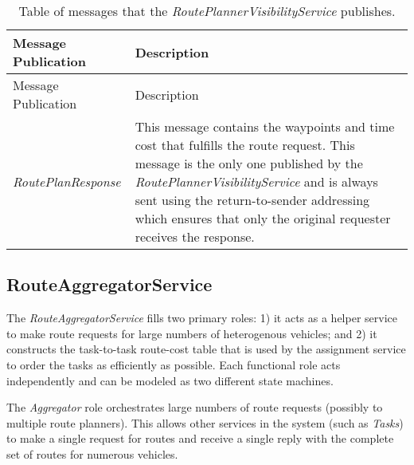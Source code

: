 \begin{longtable}[]{@{}ll@{}}
\caption{Table of messages that the \emph{RoutePlannerVisibilityService}
publishes.}\tabularnewline
\toprule
\begin{minipage}[b]{0.40\columnwidth}\raggedright\strut
Message Publication\strut
\end{minipage} & \begin{minipage}[b]{0.55\columnwidth}\raggedright\strut
Description\strut
\end{minipage}\tabularnewline
\midrule
\endfirsthead
\toprule
\begin{minipage}[b]{0.40\columnwidth}\raggedright\strut
Message Publication\strut
\end{minipage} & \begin{minipage}[b]{0.55\columnwidth}\raggedright\strut
Description\strut
\end{minipage}\tabularnewline
\midrule
\endhead
\begin{minipage}[t]{0.40\columnwidth}\raggedright\strut
\emph{RoutePlanResponse}\strut
\end{minipage} & \begin{minipage}[t]{0.55\columnwidth}\raggedright\strut
This message contains the waypoints and time cost that fulfills the
route request. This message is the only one published by the
\emph{RoutePlannerVisibilityService} and is always sent using the
return-to-sender addressing which ensures that only the original
requester receives the response.\strut
\end{minipage}\tabularnewline
\bottomrule
\end{longtable}

\subsection{RouteAggregatorService}\label{routeaggregatorservice}

The \emph{RouteAggregatorService} fills two primary roles: 1) it acts as
a helper service to make route requests for large numbers of
heterogenous vehicles; and 2) it constructs the task-to-task route-cost
table that is used by the assignment service to order the tasks as
efficiently as possible. Each functional role acts independently and can
be modeled as two different state machines.

The \emph{Aggregator} role orchestrates large numbers of route requests
(possibly to multiple route planners). This allows other services in the
system (such as \emph{Tasks}) to make a single request for routes and
receive a single reply with the complete set of routes for numerous
vehicles.

